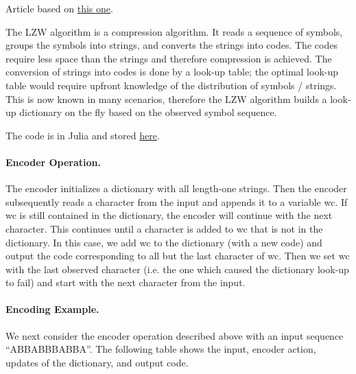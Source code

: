 
Article based on \href{https://marknelson.us/posts/2011/11/08/lzw-revisited.html}{this one}.

The LZW algorithm is a compression algorithm. It reads a sequence of symbols, groups the symbols into strings, and converts the strings into codes. The codes require less space than the strings and therefore compression is achieved. The conversion of strings into codes is done by a look-up table; the optimal look-up table would require upfront knowledge of the distribution of symbols / strings. This is now known in many scenarios, therefore the LZW algorithm builds a look-up dictionary on the fly based on the observed symbol sequence.

The code is in Julia and stored \href{https://github.com/ClemensFMN/JuliaStuff/blob/master/algorithms/lzw.jl}{here}.

\paragraph{Encoder Operation.} The encoder initializes a dictionary with all length-one strings. Then the encoder subsequently reads a character from the input and appends it to a variable wc. If wc is still contained in the dictionary, the encoder will continue with the next character. This continues until a character is added to wc that is not in the dictionary. In this case, we add wc to the dictionary (with a new code) and output the code corresponding to all but the last character of wc. Then we set wc with the last observed character (i.e. the one which caused the dictionary look-up to fail) and start with the next character from the input.

\paragraph{Encoding Example.} We next consider the encoder operation described above with an input sequence ``ABBABBBABBA''. The following table shows the input, encoder action, updates of the dictionary, and output code.


